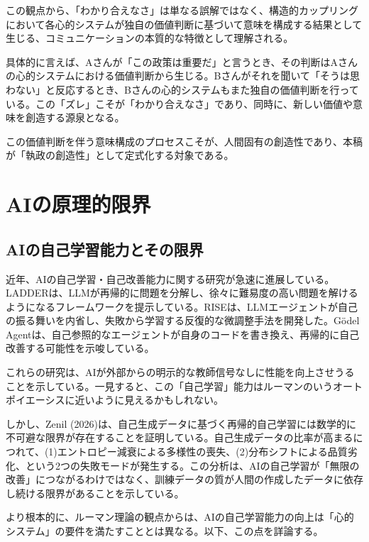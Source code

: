 \documentclass{keikaku}
\begin{document}
この観点から、「わかり合えなさ」は単なる誤解ではなく、構造的カップリングにおいて各心的システムが独自の価値判断に基づいて意味を構成する結果として生じる、コミュニケーションの本質的な特徴として理解される。

具体的に言えば、Aさんが「この政策は重要だ」と言うとき、その判断はAさんの心的システムにおける価値判断から生じる。Bさんがそれを聞いて「そうは思わない」と反応するとき、Bさんの心的システムもまた独自の価値判断を行っている。この「ズレ」こそが「わかり合えなさ」であり、同時に、新しい価値や意味を創造する源泉となる。

この価値判断を伴う意味構成のプロセスこそが、人間固有の創造性であり、本稿が「執政の創造性」として定式化する対象である。

\section{AIの原理的限界}

\subsection{AIの自己学習能力とその限界}

近年、AIの自己学習・自己改善能力に関する研究が急速に進展している。LADDER\cite{simonds2025}は、LLMが再帰的に問題を分解し、徐々に難易度の高い問題を解けるようになるフレームワークを提示している。RISE\cite{qu2024}は、LLMエージェントが自己の振る舞いを内省し、失敗から学習する反復的な微調整手法を開発した。Gödel Agent\cite{yin2024}は、自己参照的なエージェントが自身のコードを書き換え、再帰的に自己改善する可能性を示唆している。

これらの研究は、AIが外部からの明示的な教師信号なしに性能を向上させうることを示している。一見すると、この「自己学習」能力はルーマンのいうオートポイエーシスに近いように見えるかもしれない。

しかし、Zenil (2026)は、自己生成データに基づく再帰的自己学習には数学的に不可避な限界が存在することを証明している\cite{zenil2026}。自己生成データの比率が高まるにつれて、(1)エントロピー減衰による多様性の喪失、(2)分布シフトによる品質劣化、という2つの失敗モードが発生する。この分析は、AIの自己学習が「無限の改善」につながるわけではなく、訓練データの質が人間の作成したデータに依存し続ける限界があることを示している。

より根本的に、ルーマン理論の観点からは、AIの自己学習能力の向上は「心的システム」の要件を満たすこととは異なる。以下、この点を詳論する。
\end{document}
